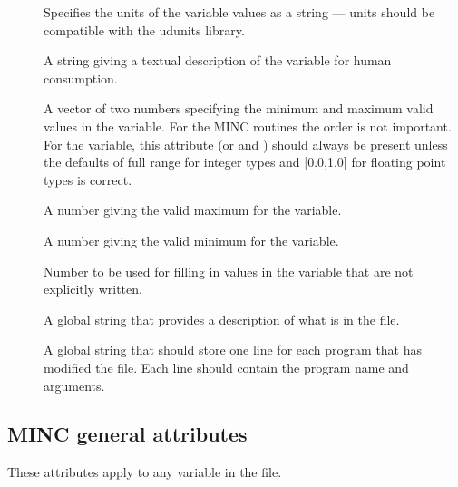\begin{description}
   \item [] Specifies the units of the variable values
      as a string --- units should be compatible with the udunits
      library.
   \item [] A string giving a textual description of
      the variable for human consumption.
   \item [] A vector of two numbers specifying the
      minimum and maximum valid values in the variable. For the MINC
      routines the order is not important. For the 
      variable, this attribute (or  and
      ) should always be present unless the
      defaults of full range for integer types and [0.0,1.0] for floating
      point types is correct.
   \item [] A number giving the valid maximum for
      the variable.
   \item [] A number giving the valid minimum for
      the variable.
   \item [] Number to be used for filling in values in
      the variable that are not explicitly written.
   \item [] A global string that provides a description
      of what is in the file.
   \item [] A global string that should store one line
      for each program that has modified the file. Each line should
      contain the program name and arguments.
\end{description}

\subsection{MINC general attributes}

These attributes apply to any variable in the file. 

